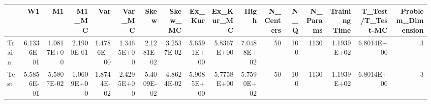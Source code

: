 \begin{tabular}{lrrrrrrrrrrrrrrrr}
\toprule
{} &         W1 &         M1 &      M1\_MC &        Var &     Var\_MC &       Skew &    Skew\_MC &     Ex\_Kur &  Ex\_Kur\_MC &       High &  N\_Centers &  N\_Q &  N\_Params &  Training Time &  T\_Test/T\_Test-MC &  Problem\_Dimension \\
\midrule
Train & 6.1336E-01 & 1.0817E+00 & 2.1900E-01 & 1.4786E+00 & 1.3465E+00 & 2.1281E-02 & 3.2537E-02 & 5.6591E+00 & 5.8367E+00 & 7.0488E+02 &         50 &  100 &      1130 &     1.1939E+02 &        6.8014E+00 &                  3 \\
Test  & 5.5856E-01 & 5.5807E-02 & 1.0609E+00 & 1.8744E-02 & 2.4295E+00 & 5.4009E-02 & 4.8624E-02 & 5.9085E+00 & 5.7758E+00 & 5.7590E+02 &         50 &  100 &      1130 &     1.1939E+02 &        6.8014E+00 &                  3 \\
\bottomrule
\end{tabular}

